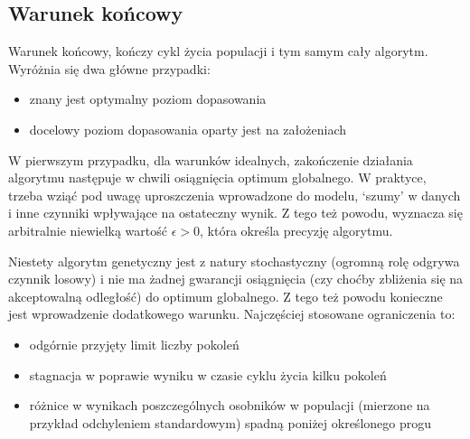 \documentclass[a4paper,12pt]{article}
\numberwithin{figure}{section}
\begin{document}
    \subsection{Warunek końcowy}

    \noindent
    \begin{minipage}[H]{\textwidth}
        \setlength\parindent{17pt} Warunek końcowy, kończy cykl życia populacji i tym samym cały algorytm. Wyróżnia się dwa główne przypadki\cite{IntroductionToEvolutionaryComputing2015}:
        \begin{itemize}
            \item znany jest optymalny poziom dopasowania
            \item docelowy poziom dopasowania oparty jest na założeniach
        \end{itemize}
    \end{minipage}

    \bigskip

    W pierwszym przypadku, dla warunków idealnych, zakończenie działania algorytmu następuje w chwili osiągnięcia optimum globalnego. W praktyce, trzeba wziąć pod uwagę uproszczenia wprowadzone do modelu, `szumy' w danych i inne czynniki wpływające na ostateczny wynik. Z tego też powodu, wyznacza się arbitralnie niewielką wartość $\epsilon > 0$, która określa precyzję algorytmu\cite{IntroductionToEvolutionaryComputing2015}.

    \bigskip

    \noindent
    \begin{minipage}[H]{\textwidth}
        \setlength\parindent{17pt} Niestety algorytm genetyczny jest z natury stochastyczny (ogromną rolę odgrywa czynnik losowy) i nie ma żadnej gwarancji osiągnięcia (czy choćby zbliżenia się na akceptowalną odległość) do optimum globalnego. Z tego też powodu konieczne jest wprowadzenie dodatkowego warunku. Najczęściej stosowane ograniczenia to\cite{IntroductionToEvolutionaryComputing2015}:
        \begin{itemize}
            \item odgórnie przyjęty limit liczby pokoleń
            \item stagnacja w poprawie wyniku w czasie cyklu życia kilku pokoleń
            \item różnice w wynikach poszczególnych osobników w populacji (mierzone na przykład odchyleniem standardowym) spadną poniżej określonego progu
        \end{itemize}
    \end{minipage}
\end{document}
